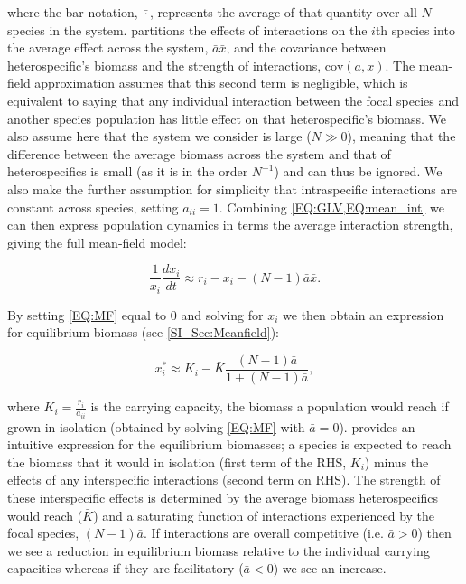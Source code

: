 \documentclass{article}
\begin{document}
where the bar notation, $\bar{\cdot}$, represents the average of that quantity over all $N$ species in the system.  partitions the effects of interactions on the $i$th species into the average effect across the system, $\bar{a} \bar{x}$, and the covariance between heterospecific's biomass and the strength of interactions, $\text{cov}(a,x)$. The mean-field approximation assumes that this second term is negligible, which is equivalent to saying that any individual interaction between the focal species and another species population has little effect on that heterospecific's biomass. We also assume here that the system we consider is large ($N \gg 0$), meaning that the difference between the average biomass across the system and that of heterospecifics is small (as it is in the order $N^{-1}$) and can thus be ignored. We also make the further assumption for simplicity that intraspecific interactions are constant across species, setting $a_{ii} = 1$. Combining \cref{EQ:GLV,EQ:mean_int}  we can then express population dynamics in terms the average interaction strength, giving the full mean-field model:

\begin{equation} \label{EQ:MF}
    \frac{1}{x_i} \frac{dx_i}{dt} \approx r_i - x_i - (N-1)\bar{a}\bar{x}.
\end{equation}

By setting \cref{EQ:MF} equal to $0$ and solving for $x_i$ we then obtain an expression for equilibrium biomass (see \cref{SI_Sec:Meanfield}):

\begin{equation}\label{EQ:MF_eqi}
  x^*_i \approx K_i -  \bar{K}  \frac{ (N-1)\bar{a}}{1 + (N-1)\bar{a}}, 
\end{equation}

where $K_i = \frac{r_i}{a_{ii}}$ is the carrying capacity, the biomass a population would reach if grown in isolation (obtained by solving \cref{EQ:MF} with $\bar{a} = 0$).  provides an intuitive expression for the equilibrium biomasses; a species is expected to reach the biomass that it would in isolation (first term of the RHS, $K_i$) minus the effects of any interspecific interactions (second term on RHS). The strength of these interspecific effects is determined by the average biomass heterospecifics would reach ($\bar{K}$) and a saturating function of interactions experienced by the focal species, $(N-1)\bar{a}$. If interactions are overall competitive (i.e. $ \bar{a} > 0$) then we see a reduction in equilibrium biomass relative to the individual carrying capacities whereas if they are facilitatory ($ \bar{a} < 0$) we see an increase.  
\end{document}
